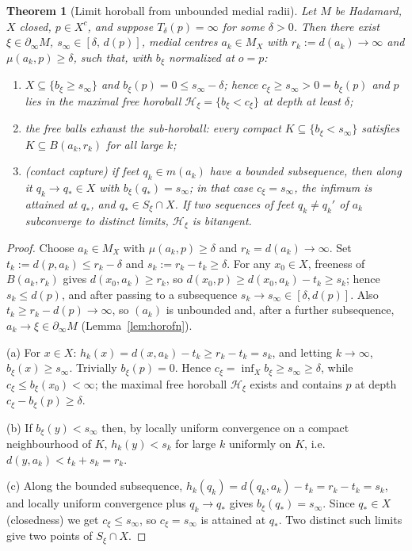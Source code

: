 \documentclass[11pt]{article}
\newtheorem{theorem}{Theorem}[section]
\theoremstyle{remark}
\newcommand{\X}{X}
\newcommand{\Mx}{M_{\X}}
\newcommand{\Hb}[1]{\mathcal{H}_{#1}}
\newcommand{\Sb}[1]{S_{#1}}
\newcommand{\B}{B}
\newcommand{\bdry}{\partial_{\infty}}
\begin{document}
\begin{theorem}[Limit horoball from unbounded medial radii]
\label{thm:branch-two}
Let $M$ be Hadamard, $\X$ closed, $p\in\X^{c}$, and suppose
$T_{\delta}(p)=\infty$ for some $\delta>0$. Then there exist
$\xi\in\bdry M$, $s_{\infty}\in[\delta,\,d(p)]$, medial centres
$a_{k}\in\Mx$ with $r_{k}:=d(a_{k})\to\infty$ and
$\mu(a_{k},p)\ge\delta$, such that, with $b_{\xi}$ normalized at
$o=p$:
\begin{enumerate}[label=(\alph*)]
\item $\X\subseteq\{b_{\xi}\ge s_{\infty}\}$ and
$b_{\xi}(p)=0\le s_{\infty}-\delta$; hence $c_{\xi}\ge
s_{\infty}>0=b_{\xi}(p)$ and $p$ lies in the maximal free horoball
$\Hb{\xi}=\{b_{\xi}<c_{\xi}\}$ at depth at least $\delta$;
\item the free balls exhaust the sub-horoball: every compact
$K\subseteq\{b_{\xi}<s_{\infty}\}$ satisfies
$K\subseteq\B(a_{k},r_{k})$ for all large $k$;
\item \emph{(contact capture)} if feet $q_{k}\in m(a_{k})$ have a
bounded subsequence, then along it $q_{k}\to q_{*}\in\X$ with
$b_{\xi}(q_{*})=s_{\infty}$; in that case $c_{\xi}=s_{\infty}$, the
infimum is attained at $q_{*}$, and $q_{*}\in \Sb{\xi}\cap\X$.
If two sequences of feet $q_{k}\neq q_{k}'$ of $a_{k}$ subconverge to
\emph{distinct} limits, $\Hb{\xi}$ is bitangent.
\end{enumerate}
\end{theorem}

\begin{proof}
Choose $a_{k}\in\Mx$ with $\mu(a_{k},p)\ge\delta$ and
$r_{k}=d(a_{k})\to\infty$. Set $t_{k}:=d(p,a_{k})\le r_{k}-\delta$
and $s_{k}:=r_{k}-t_{k}\ge\delta$. For any $x_{0}\in\X$, freeness of
$\B(a_{k},r_{k})$ gives $d(x_{0},a_{k})\ge r_{k}$, so
$d(x_{0},p)\ge d(x_{0},a_{k})-t_{k}\ge s_{k}$; hence
$s_{k}\le d(p)$, and after passing to a subsequence
$s_{k}\to s_{\infty}\in[\delta,d(p)]$. Also
$t_{k}\ge r_{k}-d(p)\to\infty$, so $(a_{k})$ is unbounded and, after a
further subsequence, $a_{k}\to\xi\in\bdry M$
(Lemma~\ref{lem:horofn}).

(a) For $x\in\X$: $h_{k}(x)=d(x,a_{k})-t_{k}\ge r_{k}-t_{k}=s_{k}$,
and letting $k\to\infty$, $b_{\xi}(x)\ge s_{\infty}$. Trivially
$b_{\xi}(p)=0$. Hence $c_{\xi}=\inf_{\X}b_{\xi}\ge
s_{\infty}\ge\delta$, while $c_{\xi}\le b_{\xi}(x_{0})<\infty$; the
maximal free horoball $\Hb{\xi}$ exists and contains $p$ at depth
$c_{\xi}-b_{\xi}(p)\ge\delta$.

(b) If $b_{\xi}(y)<s_{\infty}$ then, by locally uniform convergence
on a compact neighbourhood of $K$,
$h_{k}(y)<s_{k}$ for large $k$ uniformly on $K$, i.e.\
$d(y,a_{k})<t_{k}+s_{k}=r_{k}$.

(c) Along the bounded subsequence,
$h_{k}(q_{k})=d(q_{k},a_{k})-t_{k}=r_{k}-t_{k}=s_{k}$, and locally
uniform convergence plus $q_{k}\to q_{*}$ gives
$b_{\xi}(q_{*})=s_{\infty}$. Since $q_{*}\in\X$ (closedness) we get
$c_{\xi}\le s_{\infty}$, so $c_{\xi}=s_{\infty}$ is attained at
$q_{*}$. Two distinct such limits give two points of
$\Sb{\xi}\cap\X$.
\end{proof}
\end{document}
